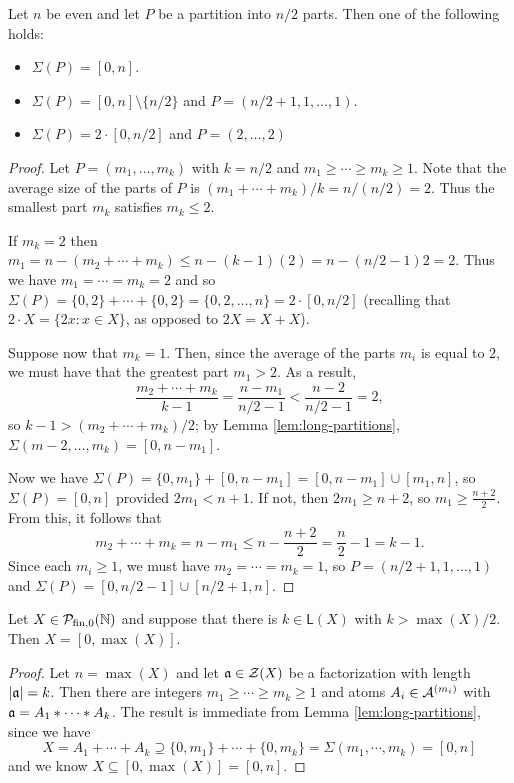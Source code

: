 \begin{lemma} \label{lem:n/2-partitions}
	Let $n$ be even and let $P$ be a partition into $n/2$ parts.
	Then one of the following holds:
	\begin{itemize}
		\item $\Sigma(P) = [ 0, n ]$.
		\item $\Sigma(P) = [ 0,n ]\setminus\{n/2\}$ and $P = (n/2+1,1,\dots,1)$.
		\item $\Sigma(P) = 2\cdot [ 0, n/2 ]$ and $P = (2,\dots, 2)$
	\end{itemize}
\end{lemma}

\begin{proof}
	Let $P = (m_1,\dots, m_k)$ with $k=n/2$ and $m_1\ge \cdots \ge m_k \ge 1$.
	Note that the average size of the parts of $P$ is $(m_1+\cdots+m_k)/k = n/(n/2) = 2$.
	Thus the smallest part $m_k$ satisfies $m_k \le 2$.
	
	If $m_k = 2$ then $m_1 = n - (m_2+\cdots+m_k) \le n - (k-1)(2) = n - (n/2-1)2 = 2$.
	Thus we have $m_1 = \cdots = m_k = 2$ and so $\Sigma(P) = \{0,2\}+\cdots+\{0,2\} = \{0,2,\dots,n\} = 2\cdot[0,n/2]$ (recalling that $2\cdot X = \{2x: x\in X\}$, as opposed to $2X = X+X$).
	
	Suppose now that $m_k=1$.
	Then, since the average of the parts $m_i$ is equal to $2$, we must have that the greatest part $m_1 > 2$.
	As a result, 
	\[\frac{m_2+\cdots+m_k}{k-1} = \frac{n-m_1}{n/2-1} < \frac{n-2}{n/2-1} = 2, \]
	so $k-1 > (m_2 + \cdots + m_k)/2$; by Lemma \ref{lem:long-partitions}, $\Sigma(m-2,\dots,m_k) = [ 0, n-m_1 ]$.
	
	Now we have $\Sigma(P) = \{0,m_1\} + [ 0,n-m_1] = [ 0,n-m_1 ] \cup [ m_1, n]$, so $\Sigma(P) = [ 0,n ]$ provided $2m_1 < n+1$.
	If not, then $2m_1 \ge n+2$, so $m_1 \ge \frac{n+2}{2}$.
	From this, it follows that 
	\[m_2 +\cdots+m_k = n-m_1 \le n - \frac{n+2}{2} = \frac{n}{2}-1 = k-1.\]
	Since each $m_i \ge 1$, we must have $m_2 = \cdots = m_k = 1$, so $P = (n/2+1, 1,\dots, 1)$ and $\Sigma(P) = [ 0,n/2-1 ] \cup [ n/2+1,n]$.
\end{proof}

\begin{thm}
	Let $X \in \PN$ and suppose that there is $k\in \mathsf{L}(X)$ with $k > \max(X)/2$.
	Then $X = [ 0, \max(X) ]$.
\end{thm}

\begin{proof}
	Let $n = \max(X)$ and let $\aa\in\Z(X)$ be a factorization with length $|\aa| = k$.
	Then there are integers $m_1\ge\cdots \ge m_k \ge 1$ and atoms $A_i\in \A^{(m_i)}$ with $\aa = A_1*\cdots*A_k$.
	The result is immediate from Lemma \ref{lem:long-partitions}, since we have
	\[ X = A_1 + \cdots + A_k \supseteq \{0,m_1\} + \cdots + \{0,m_k\} = \Sigma(m_1,\cdots,m_k) = [ 0,n ] \]
	and we know $X \subseteq [ 0,\max(X) ] = [ 0, n ]$.
\end{proof}
